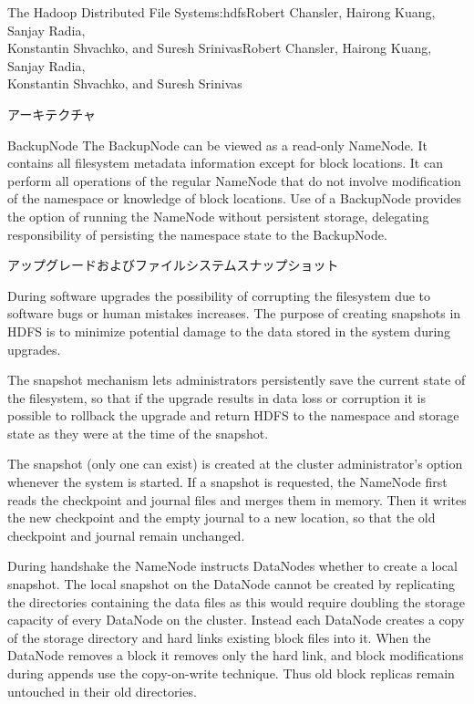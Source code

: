 \begin{aosachaptertoc}{The Hadoop Distributed File System}{s:hdfs}{Robert Chansler, Hairong Kuang, Sanjay Radia, \\ Konstantin Shvachko, and Suresh Srinivas}{Robert Chansler, Hairong Kuang, Sanjay Radia, \\ \hspace*{0.9cm} Konstantin Shvachko, and Suresh Srinivas}
\begin{aosasect1}{アーキテクチャ}
\begin{aosasect2}{BackupNode}
The BackupNode can be viewed as a read-only NameNode. It contains all
filesystem metadata information except for block locations. It can
perform all operations of the regular NameNode that do not involve
modification of the namespace or knowledge of block locations. Use of
a BackupNode provides the option of running the NameNode without
persistent storage, delegating responsibility of persisting the
namespace state to the BackupNode.

\end{aosasect2}

\begin{aosasect2}{アップグレードおよびファイルシステムスナップショット}

During software upgrades the possibility of corrupting the filesystem
due to software bugs or human mistakes increases. The purpose of
creating snapshots in HDFS is to minimize potential damage to the data
stored in the system during upgrades.

The snapshot mechanism lets administrators persistently save the
current state of the filesystem, so that if the upgrade results in
data loss or corruption it is possible to rollback the upgrade and
return HDFS to the namespace and storage state as they were at the
time of the snapshot.

The snapshot (only one can exist) is created at the cluster
administrator's option whenever the system is started. If a snapshot
is requested, the NameNode first reads the checkpoint and journal
files and merges them in memory. Then it writes the new checkpoint and
the empty journal to a new location, so that the old checkpoint and
journal remain unchanged.

During handshake the NameNode instructs DataNodes whether to create a
local snapshot. The local snapshot on the DataNode cannot be created
by replicating the directories containing the data files as this would require
doubling the storage capacity of every DataNode on the
cluster. Instead each DataNode creates a copy of the storage directory
and hard links existing block files into it. When the DataNode removes
a block it removes only the hard link, and block modifications during
appends use the copy-on-write technique.  Thus old block replicas
remain untouched in their old directories.


\end{aosasect2}
\end{aosasect1}
\end{aosachaptertoc}
